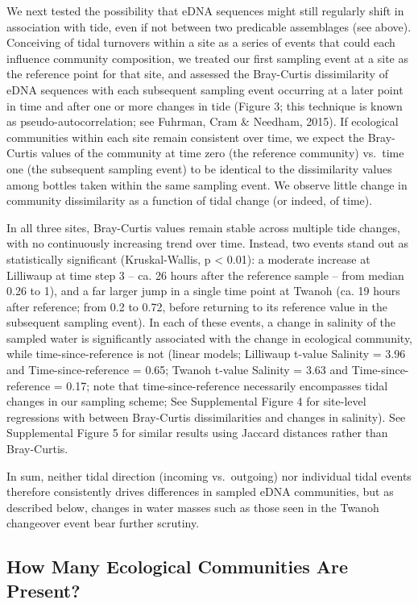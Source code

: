 \documentclass[fleqn,10pt,lineno]{wlpeerj} %
\begin{document}
We next tested the possibility that eDNA sequences might still regularly
shift in association with tide, even if not between two predicable
assemblages (see above). Conceiving of tidal turnovers within a site as
a series of events that could each influence community composition, we
treated our first sampling event at a site as the reference point for
that site, and assessed the Bray-Curtis dissimilarity of eDNA sequences
with each subsequent sampling event occurring at a later point in time
and after one or more changes in tide (Figure 3; this technique is known
as pseudo-autocorrelation; see Fuhrman, Cram \& Needham, 2015). If
ecological communities within each site remain consistent over time, we
expect the Bray-Curtis values of the community at time zero (the
reference community) vs.~time one (the subsequent sampling event) to be
identical to the dissimilarity values among bottles taken within the
same sampling event. We observe little change in community dissimilarity
as a function of tidal change (or indeed, of time).

In all three sites, Bray-Curtis values remain stable across multiple
tide changes, with no continuously increasing trend over time. Instead,
two events stand out as statistically significant (Kruskal-Wallis, p
\textless{} 0.01): a moderate increase at Lilliwaup at time step 3 --
ca. 26 hours after the reference sample -- from median 0.26 to 1), and a
far larger jump in a single time point at Twanoh (ca. 19 hours after
reference; from 0.2 to 0.72, before returning to its reference value in
the subsequent sampling event). In each of these events, a change in
salinity of the sampled water is significantly associated with the
change in ecological community, while time-since-reference is not
(linear models; Lilliwaup t-value Salinity = 3.96 and
Time-since-reference = 0.65; Twanoh t-value Salinity = 3.63 and
Time-since-reference = 0.17; note that time-since-reference necessarily
encompasses tidal changes in our sampling scheme; See Supplemental
Figure 4 for site-level regressions with between Bray-Curtis
dissimilarities and changes in salinity). See Supplemental Figure 5 for
similar results using Jaccard distances rather than Bray-Curtis.

In sum, neither tidal direction (incoming vs.~outgoing) nor individual
tidal events therefore consistently drives differences in sampled eDNA
communities, but as described below, changes in water masses such as
those seen in the Twanoh changeover event bear further scrutiny.

\subsection{How Many Ecological Communities Are
Present?}\label{how-many-ecological-communities-are-present-1}
\end{document}
